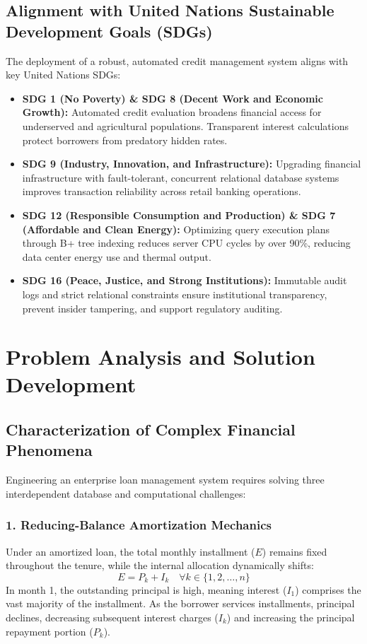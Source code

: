 \documentclass[11pt,a4paper]{report}
\begin{document}
\subsection{Alignment with United Nations Sustainable Development Goals (SDGs)}
The deployment of a robust, automated credit management system aligns with key United Nations SDGs:
\begin{itemize}
    \item \textbf{SDG 1 (No Poverty) \& SDG 8 (Decent Work and Economic Growth):} Automated credit evaluation broadens financial access for underserved and agricultural populations. Transparent interest calculations protect borrowers from predatory hidden rates.
    \item \textbf{SDG 9 (Industry, Innovation, and Infrastructure):} Upgrading financial infrastructure with fault-tolerant, concurrent relational database systems improves transaction reliability across retail banking operations.
    \item \textbf{SDG 12 (Responsible Consumption and Production) \& SDG 7 (Affordable and Clean Energy):} Optimizing query execution plans through B+ tree indexing reduces server CPU cycles by over 90\%, reducing data center energy use and thermal output.
    \item \textbf{SDG 16 (Peace, Justice, and Strong Institutions):} Immutable audit logs and strict relational constraints ensure institutional transparency, prevent insider tampering, and support regulatory auditing.
\end{itemize}

\section{Problem Analysis and Solution Development}

\subsection{Characterization of Complex Financial Phenomena}
Engineering an enterprise loan management system requires solving three interdependent database and computational challenges:

\subsubsection{1. Reducing-Balance Amortization Mechanics}
Under an amortized loan, the total monthly installment ($E$) remains fixed throughout the tenure, while the internal allocation dynamically shifts:
\begin{equation}
    E = P_k + I_k \quad \forall k \in \{1, 2, \dots, n\}
\end{equation}
In month 1, the outstanding principal is high, meaning interest ($I_1$) comprises the vast majority of the installment. As the borrower services installments, principal declines, decreasing subsequent interest charges ($I_k$) and increasing the principal repayment portion ($P_k$).
\end{document}
